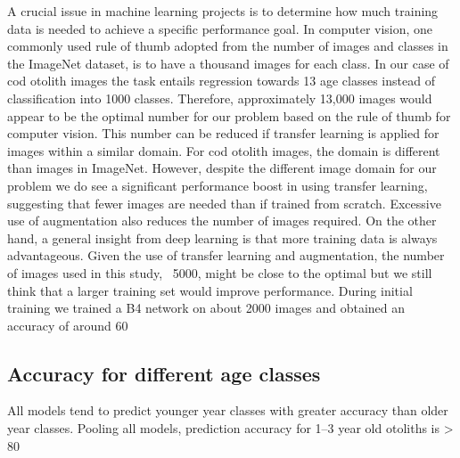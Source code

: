 \documentclass[10pt,letterpaper]{article}
\begin{document}
A crucial issue in machine learning projects is to determine how much training data is needed to achieve a specific performance goal. In computer vision, one commonly used rule of thumb adopted from the number of images and classes in the ImageNet dataset, is to have a thousand images for each class. In our case of cod otolith images the task entails regression towards 13 age classes instead of classification into 1000 classes. Therefore, approximately 13,000 images would appear to be the optimal number for our problem based on the rule of thumb for computer vision. This number can be reduced if transfer learning is applied for images within a similar domain. For cod otolith images, the domain is different than images in ImageNet. However, despite the different image domain for our problem we do see a significant performance boost in using transfer learning, suggesting that fewer images are needed than if trained from scratch. Excessive use of augmentation also reduces the number of images required. On the other hand, a general insight from deep learning is that more training data is always advantageous. Given the use of transfer learning and augmentation, the number of images used in this study, ~5000, might be close to the optimal but we still think that a larger training set would improve performance. During initial training we trained a B4 network on about 2000 images and obtained an accuracy of around 60%

\subsection*{Accuracy for different age classes}
All models tend to predict younger year classes with greater accuracy than older year classes. Pooling all models, prediction accuracy for 1–3 year old otoliths is > 80%
\end{document}
